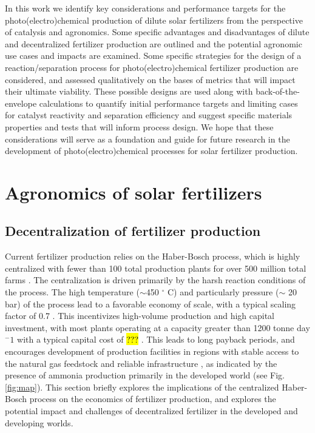 In this work we identify key considerations and performance targets for the photo(electro)chemical production of dilute solar fertilizers from the perspective of catalysis and agronomics. Some specific advantages and disadvantages of dilute and decentralized fertilizer production are outlined and the potential agronomic use cases and impacts are examined. Some specific strategies for the design of a reaction/separation process for photo(electro)chemical fertilizer production are considered, and assessed qualitatively on the bases of metrics that will impact their ultimate viability. These possible designs are used along with back-of-the-envelope calculations to quantify initial performance targets and limiting cases for catalyst reactivity and separation efficiency and suggest specific materials properties and tests that will inform process design. We hope that these considerations will serve as a foundation and guide for future research in the development of photo(electro)chemical processes for solar fertilizer production.

\section{Agronomics of solar fertilizers}

\subsection{Decentralization of fertilizer production}
\label{sec:decentralized}

Current fertilizer production relies on the Haber-Bosch process, which is highly centralized with fewer than 100 total production plants \cite{McArthur_2017} for over 500 million total farms \cite{FAO_2014,Lowder_2016}. The centralization is driven primarily by the harsh reaction conditions of the process. The high temperature ($\sim$450 $^\circ$ C) and particularly pressure ($\sim$ 20 bar) of the process lead to a favorable economy of scale, with a typical scaling factor of 0.7 \cite{Ullmann_amm_2006}. This incentivizes high-volume production and high capital investment, with most plants operating at a capacity greater than 1200 tonne day$^-1$ with a typical capital cost of \hl{???} \cite{Ullmann_amm_2006}. This leads to long payback periods, and encourages development of production facilities in regions with stable access to the natural gas feedstock and reliable infrastructure \cite{McArthur_2017}, as indicated by the presence of ammonia production primarily in the developed world (see Fig. \ref{fig:map}). This section briefly explores the implications of the centralized Haber-Bosch process on the economics of fertilizer production, and explores the potential impact and challenges of decentralized fertilizer in the developed and developing worlds.

